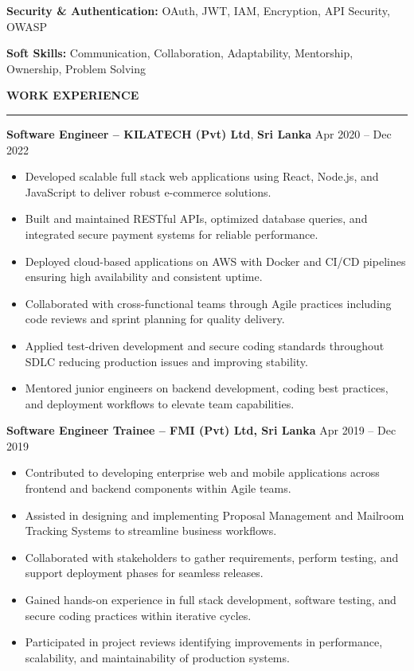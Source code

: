 \documentclass[10pt,letterpaper]{article}
\begin{document}
\textbf{Security \& Authentication:} OAuth, JWT, IAM, Encryption, API Security, OWASP

\textbf{Soft Skills:} Communication, Collaboration, Adaptability, Mentorship, Ownership, Problem Solving

\vspace{8pt}

\textbf{WORK EXPERIENCE}\\[-8pt]
\noindent\rule{\textwidth}{1pt}

\vspace{-2pt}

\textbf{Software Engineer -- KILATECH (Pvt) Ltd}, \textbf{Sri Lanka} \hfill Apr 2020 -- Dec 2022

\vspace{-1pt}

\begin{itemize}
\item Developed scalable full stack web applications using React, Node.js, and JavaScript to deliver robust e-commerce solutions.
\item Built and maintained RESTful APIs, optimized database queries, and integrated secure payment systems for reliable performance.
\item Deployed cloud-based applications on AWS with Docker and CI/CD pipelines ensuring high availability and consistent uptime.
\item Collaborated with cross-functional teams through Agile practices including code reviews and sprint planning for quality delivery.
\item Applied test-driven development and secure coding standards throughout SDLC reducing production issues and improving stability.
\item Mentored junior engineers on backend development, coding best practices, and deployment workflows to elevate team capabilities.
\end{itemize}

\textbf{Software Engineer Trainee -- FMI (Pvt) Ltd, Sri Lanka} \hfill Apr 2019 -- Dec 2019

\vspace{-1pt}

\begin{itemize}
\item Contributed to developing enterprise web and mobile applications across frontend and backend components within Agile teams.
\item Assisted in designing and implementing Proposal Management and Mailroom Tracking Systems to streamline business workflows.
\item Collaborated with stakeholders to gather requirements, perform testing, and support deployment phases for seamless releases.
\item Gained hands-on experience in full stack development, software testing, and secure coding practices within iterative cycles.
\item Participated in project reviews identifying improvements in performance, scalability, and maintainability of production systems.
\end{itemize}
\end{document}
